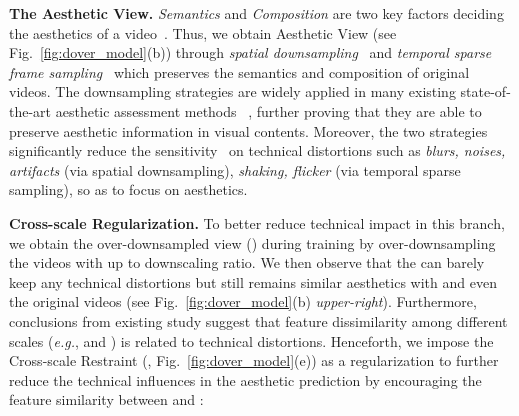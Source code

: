 \documentclass[10pt,twocolumn,letterpaper]{article}
\renewcommand{\paragraph}[1]{\noindent \textbf{#1}}
\begin{document}
\paragraph{The Aesthetic View.} \textit{Semantics} and \textit{Composition} are two key factors deciding the aesthetics of a video~\cite{aadb,cadb,distilliaa}. Thus, we obtain Aesthetic View (see Fig.~\ref{fig:dover_model}(b)) through \textit{spatial
downsampling}~\cite{bicubic} and \textit{temporal sparse frame sampling}~\cite{tsn} which preserves the semantics and composition of original videos. The downsampling strategies are widely applied in many existing state-of-the-art aesthetic assessment methods ~\cite{distilliaa,objiaa,racniaa,nima,gpfcnn}, further proving that they are able to preserve aesthetic information in visual contents. 
Moreover, the two strategies significantly 
{reduce the sensitivity}~\cite{videval, tlvqm, niqe, tpqi} on technical distortions such as \textit{blurs, noises, artifacts} (via spatial downsampling), \textit{shaking, flicker} (via temporal sparse sampling), so as to focus on aesthetics.



\begin{comment}
Given a video , the Aesthetic View  are formulated as:

where  is the blur kernel for downsampling,  is the remained frames after sparse sampling,  denotes uniform index sampling between . 
\end{comment}



\begin{comment}
\begin{figure}
    \centering
    \texttt{[image: ICCV\_ViewDecomposition\_compressed.pdf]}
    \vspace{-9pt}
    \caption{Examples for (a) the Aesthetic View () and (b) the Technical View () under \textit{View Decomposition}, focusing on different perspectives.}
   \label{fig:asvtsv}
    \vspace{-16pt}
\end{figure}
\end{comment}



\paragraph{Cross-scale Regularization.} To better reduce technical impact in this branch, we obtain the over-downsampled view () during training by over-downsampling the videos with up to  downscaling ratio. We then observe that the  can barely keep any technical distortions but still remains similar aesthetics with  and even the original videos (see Fig.~\ref{fig:dover_model}(b) \textit{upper-right}). Furthermore, conclusions from existing study \cite{dissimilarity} suggest that feature dissimilarity among different scales (\textit{e.g.},  and ) is related to technical distortions. Henceforth, we impose the {Cross-scale Restraint} (, Fig.~\ref{fig:dover_model}(e)) as a regularization to further reduce the technical influences in the aesthetic prediction by encouraging the feature similarity between  and :
\end{document}
